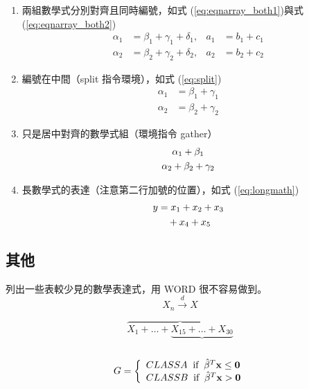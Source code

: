 \begin{enumerate}
    \item 兩組數學式分別對齊且同時編號，如式 (\ref{eq:eqnarray_both1})與式(\ref{eq:eqnarray_both2})
    \begin{align}
        \alpha_1 &= \beta_1+\gamma_1+\delta_1, &a_1 &= b_1+c_1 \label{eq:eqnarray_both1}\\
        \alpha_2 &= \beta_2+\gamma_2+\delta_2, &a_2 &= b_2+c_2 \label{eq:eqnarray_both2}
    \end{align}

    \item 編號在中間（{\A split} 指令環境），如式 (\ref{eq:split})
        \begin{equation} 
            \begin{split} \label{eq:split}
                \alpha_1 &= \beta_1+\gamma_1\\
                \alpha_2 &= \beta_2+\gamma_2
            \end{split}
        \end{equation}
    \item 只是居中對齊的數學式組（環境指令 {\A gather}）
        \begin{gather}
        \alpha_1 + \beta_1\notag\\
        \alpha_2 + \beta_2 + \gamma_2\notag
        \end{gather}

    \item 長數學式的表達（注意第二行加號的位置），如式 (\ref{eq:longmath})
        \begin{align}\label{eq:longmath}
            y  	&= x_1 + x_2 + x_3 \notag\\
                	&\quad + x_4 + x_5
        \end{align}
\end{enumerate}

\subsection{其他}
列出一些表較少見的數學表達式，用 WORD 很不容易做到。
  $$X_{n} \stackrel{d}{\longrightarrow} X$$
  
  $$\overbrace{X_{1} + \ldots + \underbrace{X_{15} + \ldots + X_{30}}}$$\\
  \begin{equation*}
    G = \left\{\begin{array}{l}
          CLASS A \;\;\mbox{if} \;\; \hat{\beta}^T\bf{x} \leq 0 \\
          CLASS B \;\;\mbox{if} \;\; \hat{\beta}^T\bf{x} > 0
        \end{array}\right.
  \end{equation*}\\

